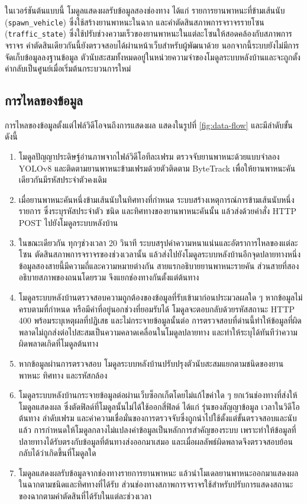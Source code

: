 ในเวอร์ชันต้นแบบนี้ โมดูลแสดงผลรับข้อมูลสองช่องทาง ได้แก่ รายการยานพาหนะที่ข้ามเส้นนับ (\texttt{spawn\_vehicle}) ซึ่งใช้สร้างยานพาหนะในฉาก และคำตัดสินสภาพการจราจรรายโซน (\texttt{traffic\_state}) ซึ่งใช้ปรับช่วงความเร็วของยานพาหนะในแต่ละโซนให้สอดคล้องกับสภาพการจราจร คำตัดสินเดียวกันนี้ยังตรวจสอบได้ผ่านหน้าเว็บสำหรับผู้พัฒนาด้วย นอกจากนี้ระบบยังไม่มีการจัดเก็บข้อมูลลงฐานข้อมูล ตัวนับสะสมทั้งหมดอยู่ในหน่วยความจำของโมดูลระบบหลังบ้านและจะถูกตั้งค่ากลับเป็นศูนย์เมื่อเริ่มต้นกระบวนการใหม่

\subsection{การไหลของข้อมูล}
\label{subsec:dataflow}

การไหลของข้อมูลตั้งแต่ไฟล์วิดีโอจนถึงการแสดงผล แสดงในรูปที่ \ref{fig:data-flow} และมีลำดับขั้นดังนี้

\begin{enumerate}
    \item โมดูลปัญญาประดิษฐ์อ่านภาพจากไฟล์วิดีโอทีละเฟรม ตรวจจับยานพาหนะด้วยแบบจำลอง YOLOv8 และติดตามยานพาหนะข้ามเฟรมด้วยตัวติดตาม ByteTrack เพื่อให้ยานพาหนะคันเดียวกันมีรหัสประจำตัวคงเดิม
    \item เมื่อยานพาหนะคันหนึ่งข้ามเส้นนับในทิศทางที่กำหนด ระบบสร้างเหตุการณ์การข้ามเส้นนับหนึ่งรายการ ซึ่งระบุรหัสประจำตัว ชนิด และทิศทางของยานพาหนะคันนั้น แล้วส่งด้วยคำสั่ง HTTP POST ไปยังโมดูลระบบหลังบ้าน
    \item ในขณะเดียวกัน ทุกๆช่วงเวลา 20 วินาที ระบบสรุปค่าความหนาแน่นและอัตราการไหลของแต่ละโซน ตัดสินสภาพการจราจรของช่วงเวลานั้น แล้วส่งไปยังโมดูลระบบหลังบ้านอีกจุดปลายทางหนึ่ง ข้อมูลสองสายนี้มีความถี่และความหมายต่างกัน สายแรกอธิบายยานพาหนะรายคัน ส่วนสายที่สองอธิบายสภาพของถนนโดยรวม จึงแยกช่องทางกันตั้งแต่ต้นทาง
    \item โมดูลระบบหลังบ้านตรวจสอบความถูกต้องของข้อมูลที่รับเข้ามาก่อนประมวลผลใด ๆ หากข้อมูลไม่ครบตามที่กำหนด หรือมีค่าที่อยู่นอกช่วงที่ยอมรับได้ โมดูลจะตอบกลับด้วยรหัสสถานะ HTTP 400 พร้อมระบุเหตุผลที่ปฏิเสธ และไม่กระจายข้อมูลนั้นต่อ การตรวจสอบที่ด่านนี้ทำให้ข้อมูลที่ผิดพลาดไม่ถูกส่งต่อไปสะสมเป็นความคลาดเคลื่อนในโมดูลปลายทาง และทำให้ระบุได้ทันทีว่าความผิดพลาดเกิดที่โมดูลต้นทาง
    \item หากข้อมูลผ่านการตรวจสอบ โมดูลระบบหลังบ้านปรับปรุงตัวนับสะสมแยกตามชนิดของยานพาหนะ ทิศทาง และรหัสกล้อง
    \item โมดูลระบบหลังบ้านกระจายข้อมูลต่อผ่านเว็บซ็อกเก็ตโดยไม่แก้ไขค่าใด ๆ ยกเว้นช่องทางที่ส่งให้โมดูลแสดงผล ซึ่งตัดฟิลด์ที่โมดูลนั้นไม่ได้ใช้ออกสี่ฟิลด์ ได้แก่ รุ่นของสัญญาข้อมูล เวลาในวิดีโอต้นทาง ลำดับเฟรม และค่าความเชื่อมั่นของการตรวจจับซึ่งถูกนำไปใช้ตั้งแต่ขั้นตรวจสอบและนับแล้ว การกำหนดให้โมดูลกลางไม่แปลงค่าข้อมูลเป็นหลักการสำคัญของระบบ เพราะทำให้ข้อมูลที่ปลายทางได้รับตรงกับข้อมูลที่ต้นทางส่งออกมาเสมอ และเมื่อผลลัพธ์ผิดพลาดจึงตรวจสอบย้อนกลับได้ว่าเกิดขึ้นที่โมดูลใด
    \item โมดูลแสดงผลรับข้อมูลจากช่องทางรายการยานพาหนะ แล้วนำโมเดลยานพาหนะออกมาแสดงผลในฉากตามชนิดและทิศทางที่ได้รับ ส่วนช่องทางสภาพการจราจรใช้สำหรับปรับการแสดงสถานะของฉากตามคำตัดสินที่ได้รับในแต่ละช่วงเวลา
\end{enumerate}

